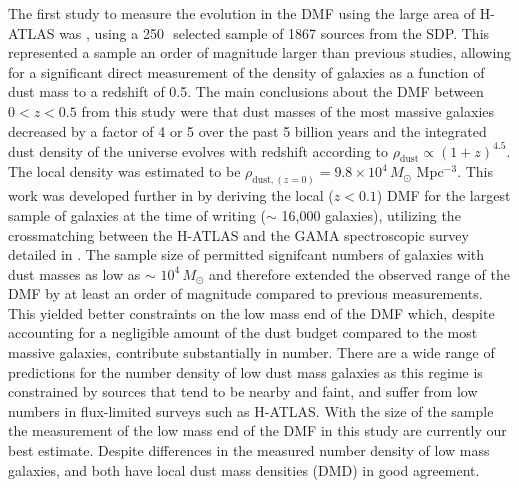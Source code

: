 The first study to measure the evolution in the DMF using the large area of H-ATLAS was \citealt{Dunne_2011}, using a 250\,\micron\ selected sample of 1867 sources from the SDP. This represented a sample an order of magnitude larger than previous studies, allowing for a significant direct measurement of the density of galaxies as a function of dust mass to a redshift of 0.5. The main conclusions about the DMF between $0 < z < 0.5$ from this study were that dust masses of the most massive galaxies decreased by a factor of 4 or 5 over the past 5 billion years and the integrated dust density of the universe evolves with redshift according to $\rho_{\textrm{dust}} \propto (1+z)^{4.5}$. The local density was estimated to be $\rho_{\textrm{dust}, (z=0)} = 9.8\times10^4$\,$M_\odot$ Mpc$^{-3}$. This work was developed further in \citealt{Beeston_2018} by deriving the local ($z < 0.1$) DMF for the largest sample of galaxies at the time of writing ($\sim$ 16,000 galaxies), utilizing the crossmatching between the H-ATLAS and the GAMA spectroscopic survey detailed in \citealt{Bourne_2016}. The sample size of \citealt{Beeston_2018} permitted signifcant numbers of galaxies with dust masses as low as $\sim$ $10^4$\,$M_\odot$ and therefore extended the observed range of the DMF by at least an order of magnitude compared to previous measurements. This yielded better constraints on the low mass end of the DMF which, despite accounting for a negligible amount of the dust budget compared to the most massive galaxies, contribute substantially in number. There are a wide range of predictions for the number density of low dust mass galaxies as this regime is constrained by sources that tend to be nearby and faint, and suffer from low numbers in flux-limited surveys such as H-ATLAS. With the size of the \citealt{Beeston_2018} sample the measurement of the low mass end of the DMF in this study are currently our best estimate. Despite differences in the measured number density of low mass galaxies, \citealt{Dunne_2011} and \citealt{Beeston_2018} both have local dust mass densities (DMD) in good agreement.

